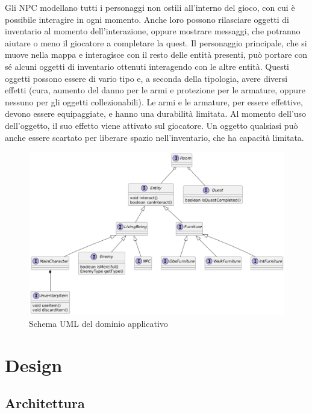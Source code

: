 \documentclass[a4paper,12pt]{report}
\begin{document}
%
\newline Gli NPC modellano tutti i personaggi non ostili all’interno del gioco, con cui è possibile interagire in ogni momento. Anche loro possono rilasciare oggetti di inventario al momento dell’interazione, oppure mostrare messaggi, che potranno aiutare o meno il giocatore a completare la quest.
%
\newline Il personaggio principale, che si muove nella mappa e interagisce con il resto delle entità presenti, può portare con sé alcuni oggetti di inventario ottenuti interagendo con le altre entità. Questi oggetti possono essere di vario tipo e, a seconda della tipologia, avere diversi effetti (cura, aumento del danno per le armi e protezione per le armature, oppure nessuno per gli oggetti collezionabili). Le armi e le armature, per essere effettive, devono essere equipaggiate, e hanno una durabilità limitata. Al momento dell’uso dell’oggetto, il suo effetto viene attivato sul giocatore. Un oggetto qualsiasi può anche essere scartato per liberare spazio nell’inventario, che ha capacità limitata.


\begin{figure}[H]
	\centering{}
	\includegraphics[width=\textwidth]{img/model.png}
	\caption{Schema UML del dominio applicativo}
	\label{img:model}
\end{figure}


\chapter{Design}

\section{Architettura}
\end{document}
